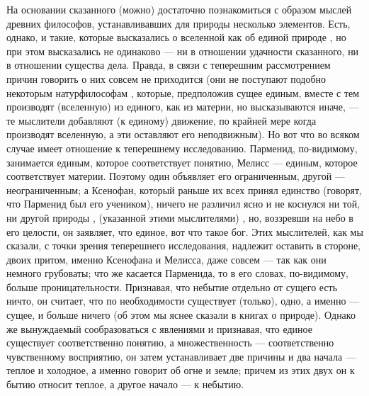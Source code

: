 \documentclass{article}
\begin{document}
На основании сказанного (можно) достаточно познакомиться с образом мыслей древних философов, устанавливавших для природы несколько элементов. Есть, однако, и такие, которые высказались о вселенной как об единой природе
\footnotemark[10]
, но при этом высказались не одинаково — ни в отношении удачности сказанного, ни в отношении существа дела.
\footnotemark[11]
Правда, в связи с теперешним рассмотрением причин говорить о них  совсем не приходится
\footnotemark[12]
(они не поступают подобно некоторым натурфилософам
\footnotemark[13]
, которые, предположив сущее единым, вместе с тем производят (вселенную) из единого, как из материи, но высказываются иначе, — те мыслители добавляют (к единому) движение, по крайней мере когда производят вселенную, а эти оставляют его неподвижным). Но вот что во всяком случае имеет отношение к теперешнему исследованию. Парменид, по-видимому, занимается единым, которое соответствует понятию, Мелисс — единым, которое соответствует материи. Поэтому один объявляет его ограниченным, другой — неограниченным; а Ксенофан, который раньше их всех принял единство (говорят, что Парменид был его учеником), ничего не различил ясно и не коснулся ни той, ни другой природы
\footnotemark[14]
, (указанной этими мыслителями)
\footnotemark[15]
, но, воззревши на небо в его целости, он заявляет, что единое, вот что такое бог. Этих мыслителей, как мы сказали, с точки зрения теперешнего исследования, надлежит оставить в стороне, двоих притом, именно Ксенофана и Мелисса, даже совсем — так как они немного грубоваты; что же касается Парменида, то в его словах, по-видимому, больше проницательности. Признавая, что небытие отдельно от сущего есть ничто, он считает, что по необходимости существует (только), одно, а именно — сущее, и больше ничего (об этом мы яснее сказали в книгах о природе).
Однако же вынуждаемый сообразоваться с явлениями и признавая, что единое существует соответственно понятию, а множественность — соответственно чувственному восприятию, он затем устанавливает две причины и два начала — теплое и холодное, а именно говорит об огне и земле; причем из этих двух он к бытию относит теплое, а другое начало — к небытию.
\end{document}
